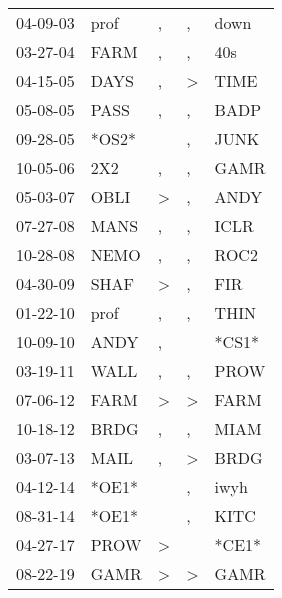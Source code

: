 \begin{supertabular}{lllll}
 04-09-03 &   prof &             , &             , &   down \\
 03-27-04 &   FARM &             , &             , &    40s \\
 04-15-05 &   DAYS &             , &  \textgreater &   TIME \\
 05-08-05 &   PASS &             , &             , &   BADP \\
 09-28-05 &  *OS2* &               &             , &   JUNK \\
 10-05-06 &    2X2 &             , &             , &   GAMR \\
 05-03-07 &   OBLI &  \textgreater &             , &   ANDY \\
 07-27-08 &   MANS &             , &             , &   ICLR \\
 10-28-08 &   NEMO &             , &             , &   ROC2 \\
 04-30-09 &   SHAF &  \textgreater &             , &    FIR \\
 01-22-10 &   prof &             , &             , &   THIN \\
 10-09-10 &   ANDY &             , &               &  *CS1* \\
 03-19-11 &   WALL &             , &             , &   PROW \\
 07-06-12 &   FARM &  \textgreater &  \textgreater &   FARM \\
 10-18-12 &   BRDG &             , &             , &   MIAM \\
 03-07-13 &   MAIL &             , &  \textgreater &   BRDG \\
 04-12-14 &  *OE1* &               &             , &   iwyh \\
 08-31-14 &  *OE1* &               &             , &   KITC \\
 04-27-17 &   PROW &  \textgreater &               &  *CE1* \\
 08-22-19 &   GAMR &  \textgreater &  \textgreater &   GAMR \\
\end{supertabular}
